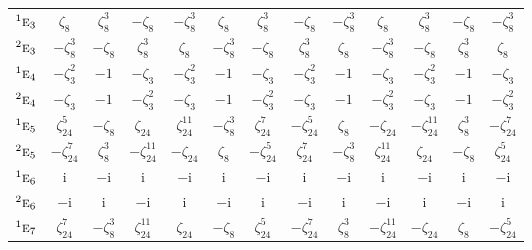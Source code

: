 \documentclass[10pt,a4paper]{article}
\numberwithin{equation}{section}
\newcommand{\irr}[1]{\text{\normalfont\scshape #1}}
\newcommand{\conjpair}[1]{{}^{#1}}
\newcommand{\iunit}{\mathrm{i}}
\newcommand{\rootunity}[1]{\zeta_{#1}}
\begin{document}
{\begin{longtable}{@{}lcccccccccccc@{}}
$\conjpair{1}\irr{e}_{3}$ & $\rootunity{8}$ & $\rootunity{8}^{3}$ & $-\rootunity{8}$ & $-\rootunity{8}^{3}$ & $\rootunity{8}$ & $\rootunity{8}^{3}$ & $-\rootunity{8}$ & $-\rootunity{8}^{3}$ & $\rootunity{8}$ & $\rootunity{8}^{3}$ & $-\rootunity{8}$ & $-\rootunity{8}^{3}$\\
$\conjpair{2}\irr{e}_{3}$ & $-\rootunity{8}^{3}$ & $-\rootunity{8}$ & $\rootunity{8}^{3}$ & $\rootunity{8}$ & $-\rootunity{8}^{3}$ & $-\rootunity{8}$ & $\rootunity{8}^{3}$ & $\rootunity{8}$ & $-\rootunity{8}^{3}$ & $-\rootunity{8}$ & $\rootunity{8}^{3}$ & $\rootunity{8}$\\
$\conjpair{1}\irr{e}_{4}$ & $-\rootunity{3}^{2}$ & $-1$ & $-\rootunity{3}$ & $-\rootunity{3}^{2}$ & $-1$ & $-\rootunity{3}$ & $-\rootunity{3}^{2}$ & $-1$ & $-\rootunity{3}$ & $-\rootunity{3}^{2}$ & $-1$ & $-\rootunity{3}$\\
$\conjpair{2}\irr{e}_{4}$ & $-\rootunity{3}$ & $-1$ & $-\rootunity{3}^{2}$ & $-\rootunity{3}$ & $-1$ & $-\rootunity{3}^{2}$ & $-\rootunity{3}$ & $-1$ & $-\rootunity{3}^{2}$ & $-\rootunity{3}$ & $-1$ & $-\rootunity{3}^{2}$\\
$\conjpair{1}\irr{e}_{5}$ & $\rootunity{24}^{5}$ & $-\rootunity{8}$ & $\rootunity{24}$ & $\rootunity{24}^{11}$ & $-\rootunity{8}^{3}$ & $\rootunity{24}^{7}$ & $-\rootunity{24}^{5}$ & $\rootunity{8}$ & $-\rootunity{24}$ & $-\rootunity{24}^{11}$ & $\rootunity{8}^{3}$ & $-\rootunity{24}^{7}$\\
$\conjpair{2}\irr{e}_{5}$ & $-\rootunity{24}^{7}$ & $\rootunity{8}^{3}$ & $-\rootunity{24}^{11}$ & $-\rootunity{24}$ & $\rootunity{8}$ & $-\rootunity{24}^{5}$ & $\rootunity{24}^{7}$ & $-\rootunity{8}^{3}$ & $\rootunity{24}^{11}$ & $\rootunity{24}$ & $-\rootunity{8}$ & $\rootunity{24}^{5}$\\
$\conjpair{1}\irr{e}_{6}$ & $\iunit{}$ & $-\iunit{}$ & $\iunit{}$ & $-\iunit{}$ & $\iunit{}$ & $-\iunit{}$ & $\iunit{}$ & $-\iunit{}$ & $\iunit{}$ & $-\iunit{}$ & $\iunit{}$ & $-\iunit{}$\\
$\conjpair{2}\irr{e}_{6}$ & $-\iunit{}$ & $\iunit{}$ & $-\iunit{}$ & $\iunit{}$ & $-\iunit{}$ & $\iunit{}$ & $-\iunit{}$ & $\iunit{}$ & $-\iunit{}$ & $\iunit{}$ & $-\iunit{}$ & $\iunit{}$\\
$\conjpair{1}\irr{e}_{7}$ & $\rootunity{24}^{7}$ & $-\rootunity{8}^{3}$ & $\rootunity{24}^{11}$ & $\rootunity{24}$ & $-\rootunity{8}$ & $\rootunity{24}^{5}$ & $-\rootunity{24}^{7}$ & $\rootunity{8}^{3}$ & $-\rootunity{24}^{11}$ & $-\rootunity{24}$ & $\rootunity{8}$ & $-\rootunity{24}^{5}$\\

\end{longtable}}
\end{document}
